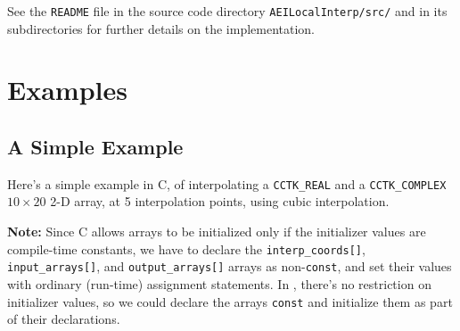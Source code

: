See the \verb|README| file in the source code directory
\verb|AEILocalInterp/src/| and in its subdirectories for further details
on the implementation.


\section{Examples}


\subsection{A Simple Example}

Here's a simple example in C, of interpolating a \verb|CCTK_REAL| and a
\verb|CCTK_COMPLEX| $10 \times 20$ 2-D array, at 5 interpolation points,
using cubic interpolation.

{\bf Note:}
Since C allows arrays to be initialized only if the initializer
values are compile-time constants, we have to declare the
\verb|interp_coords[]|, \verb|input_arrays[]|, and \verb|output_arrays[]|
arrays as non-\verb|const|, and set their values with ordinary
(run-time) assignment statements.  In \Cplusplus, there's no
restriction on initializer values, so we could declare the arrays
\verb|const| and initialize them as part of their declarations.

